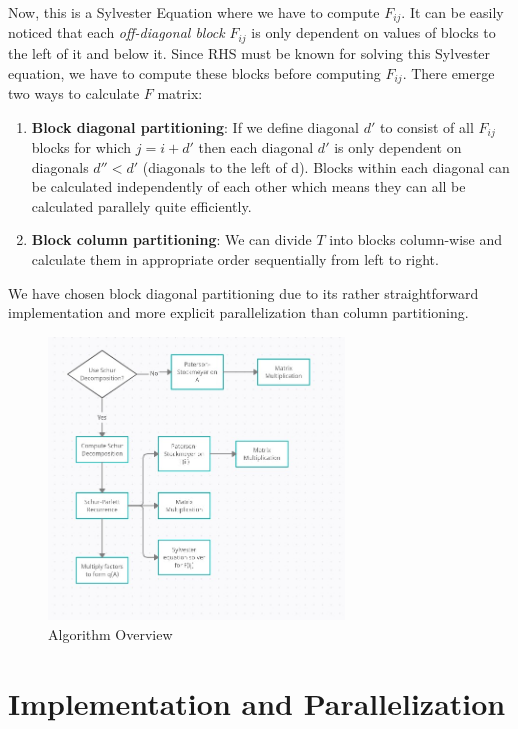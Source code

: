 \documentclass[12pt,a4paper]{article}
\begin{document}
 Now, this is a Sylvester Equation where we have to compute $F_{ij}$. It can be easily noticed that each \textit{off-diagonal block} $F_{ij}$ is only dependent on values of blocks to the left of it and below it. Since RHS must be known for solving this Sylvester equation, we have to compute these blocks before computing $F_{ij}$. There emerge two ways to calculate $F$ matrix:
\begin{enumerate}
    \item \textbf{Block diagonal partitioning}: If we define diagonal $d'$ to consist of all $F_{ij}$ blocks for which $j = i + d'$ then each diagonal $d'$ is only dependent on diagonals $d''<d'$ (diagonals to the left of d). Blocks within each diagonal can be calculated independently of each other which means they can all be calculated parallely quite efficiently.  
    \vspace{0.5cm}
    \item \textbf{Block column partitioning}: We can divide $T$ into blocks column-wise and calculate them in appropriate order sequentially from left to right. 
\end{enumerate}

We have chosen block diagonal partitioning due to its rather straightforward implementation and more explicit parallelization than column partitioning.

\newpage
\begin{figure}
    \centering
    \includegraphics[width=0.7\textwidth]{flowchart.jpeg}
    \caption{Algorithm Overview}
\end{figure}
\section{Implementation and Parallelization}
\end{document}
